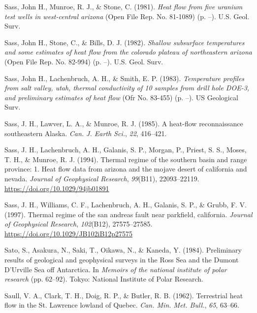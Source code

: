 \documentclass[draft,linenumbers]{agujournal2018}
\begin{document}
\leavevmode{}%
Sass, John H., Munroe, R. J., \& Stone, C. (1981). \emph{Heat flow from
five uranium test wells in west-central arizona} (Open File Rep. No.
81-1089) (p. --). U.S. Geol. Surv.

\leavevmode{}%
Sass, John H., Stone, C., \& Bills, D. J. (1982). \emph{Shallow
subsurface temperatures and some estimates of heat flow from the
colorado plateau of northeastern arizona} (Open File Rep. No. 82-994)
(p. --). U.S. Geol. Surv.

\leavevmode{}%
Sass, John H., Lachenbruch, A. H., \& Smith, E. P. (1983).
\emph{Temperature profiles from salt valley, utah, thermal conductivity
of 10 samples from drill hole DOE-3, and preliminary estimates of heat
flow} (Ofr No. 83-455) (p. --). US Geological Surv.

\leavevmode{}%
Sass, J. H., Lawver, L. A., \& Munroe, R. J. (1985). A heat-flow
reconnaissance southeastern {Alaska}. \emph{Can. J. Earth Sci.},
\emph{22}, 416--421.

\leavevmode{}%
Sass, J. H., Lachenbruch, A. H., Galanis, S. P., Morgan, P., Priest, S.
S., Moses, T. H., \& Munroe, R. J. (1994). Thermal regime of the
southern basin and range province: 1. Heat flow data from arizona and
the mojave desert of california and nevada. \emph{Journal of Geophysical
Research}, \emph{99}(B11), 22093--22119.
\url{https://doi.org/10.1029/94jb01891}

\leavevmode{}%
Sass, J. H., Williams, C. F., Lachenbruch, A. H., Galanis, S. P., \&
Grubb, F. V. (1997). Thermal regime of the san andreas fault near
parkfield, california. \emph{Journal of Geophysical Research},
\emph{102}(B12), 27575--27585.
\url{https://doi.org/10.1029/JB102iB12p27575}

\leavevmode{}%
Sato, S., Asakura, N., Saki, T., Oikawa, N., \& Kaneda, Y. (1984).
Preliminary results of geological and geophysical surveys in the {Ross
Sea} and the {Dumont D'Urville Sea} off {Antarctica}. In \emph{Memoirs
of the national institute of polar research} (pp. 62--92). Tokyo:
National Institute of Polar Research.

\leavevmode{}%
Saull, V. A., Clark, T. H., Doig, R. P., \& Butler, R. B. (1962).
Terrestrial heat flow in the {St. Lawrence} lowland of {Quebec}.
\emph{Can. Min. Met. Bull.}, \emph{65}, 63--66.
\end{document}
